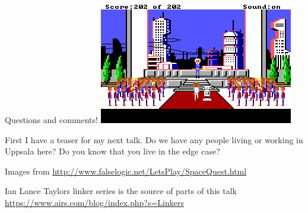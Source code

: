 \documentclass{beamer}
\begin{document}
\begin{frame}{Questions and comments!}
  \includegraphics[width=\linewidth]{sq_final}

  \footnotesize
  First I have a teaser for my next talk. Do we have any people living or working in
  Uppsala here? Do you know that you live in the edge case?

  Images from \url{http://www.falselogic.net/LetsPlay/SpaceQuest.html}

  Ian Lance Taylors linker series is the source of parts of this talk
  \url{https://www.airs.com/blog/index.php?s=Linkers}
\end{frame}
\end{document}
